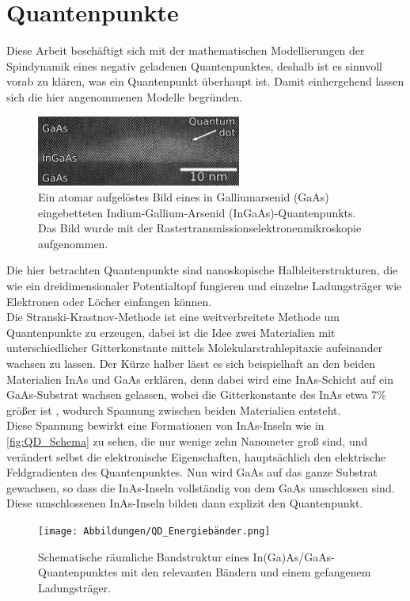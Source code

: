 \chapter{Quantenpunkte}

\noindent Diese Arbeit beschäftigt sich mit der mathematischen Modellierungen der Spindynamik eines negativ geladenen
Quantenpunktes, deshalb ist es sinnvoll vorab zu klären, was ein Quantenpunkt überhaupt ist. Damit einhergehend lassen sich die hier angenommenen Modelle begründen.\\
\begin{figure}[h!]
    \centering
    \includegraphics[width = 0.6\textwidth]{Abbildungen/Gaas_inas_quantum_dot_wikimedia.jpg}
    \caption{Ein atomar aufgelöstes Bild eines in Galliumarsenid (GaAs) eingebetteten Indium-Gallium-Arsenid (InGaAs)-Quantenpunkts. 
    Das Bild wurde mit der Rastertransmissionselektronenmikroskopie aufgenommen\cite{quantumdot_wikimedia}.}
    \label{fig:QD_Schema}
\end{figure}

\noindent Die hier betrachten Quantenpunkte sind nanoskopische Halbleiterstrukturen, die wie ein dreidimensionaler Potentialtopf fungieren
und einzelne Ladungsträger wie Elektronen oder Löcher einfangen können.\\
Die Stranski-Krastnov-Methode ist eine weitverbreitete Methode um Quantenpunkte zu erzeugen, dabei ist die Idee zwei Materialien mit 
unterschiedlicher Gitterkonstante mittels Molekularstrahlepitaxie aufeinander wachsen zu lassen. Der Kürze halber lässt es sich 
beispielhaft an den beiden Materialien InAs und GaAs erklären, denn dabei wird eine InAs-Schicht auf ein GaAs-Substrat wachsen gelassen, 
wobei die Gitterkonstante des InAs etwa 7\% größer ist \cite{RevModPhys.85.79}, wodurch Spannung zwischen beiden Materialien entsteht. \\
\noindent Diese Spannung bewirkt eine Formationen von InAs-Inseln wie in \autoref{fig:QD_Schema} zu sehen, die nur wenige zehn 
Nanometer groß sind, und verändert selbst die elektronische Eigenschaften, hauptsächlich den elektrische Feldgradienten des 
Quantenpunktes. Nun wird GaAs auf das ganze Substrat gewachsen, so dass die InAs-Inseln vollständig von 
dem GaAs umschlossen sind. Diese umschlossenen InAs-Inseln bilden dann explizit den Quantenpunkt.\\
\begin{figure}
   \centering
    \texttt{[image: Abbildungen/QD\_Energiebänder.png]}
    \caption{Schematische räumliche Bandstruktur eines In(Ga)As/GaAs-Quantenpunktes mit den relevanten Bändern und einem 
    gefangenem Ladungsträger.}
    \label{fig:QD_Bandstruktur}
\end{figure}

